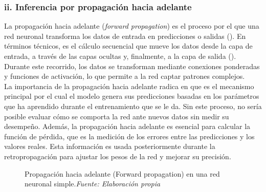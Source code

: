\documentclass[11pt]{article} %
\begin{document}
\subsubsection{ii. Inferencia por propagación hacia adelante}
La propagación hacia adelante (\textit{forward propagation}) es el proceso por el que una red neuronal transforma los datos de entrada en predicciones o salidas (\cite{datacamp_redes}). En términos técnicos, es el cálculo secuencial que mueve los datos desde la capa de entrada, a través de las capas ocultas y, finalmente, a la capa de salida (\cite{nvidia}). Durante este recorrido, los datos se transforman mediante conexiones ponderadas y funciones de activación, lo que permite a la red captar patrones complejos. \\
La importancia de la propagación hacia adelante radica en que es el mecanismo principal por el cual el modelo genera sus predicciones basadas en los parámetros que ha aprendido durante el entrenamiento que se le da. Sin este proceso, no sería posible evaluar cómo se comporta la red ante nuevos datos sin medir su desempeño. Además, la propagación hacia adelante es esencial para calcular la función de pérdida, que es la medición de los errores entre las predicciones y los valores reales. Esta información es usada posteriormente durante la retropropagación  para ajustar los pesos de la red y mejorar su precisión.
\begin{figure}[H]
    \centering
    \caption{Propagación hacia adelante (Forward propagation) en una red neuronal simple.\textit{Fuente: Elaboración propia}}
    \label{fig:forward_propagation}
\end{figure}
\end{document}
